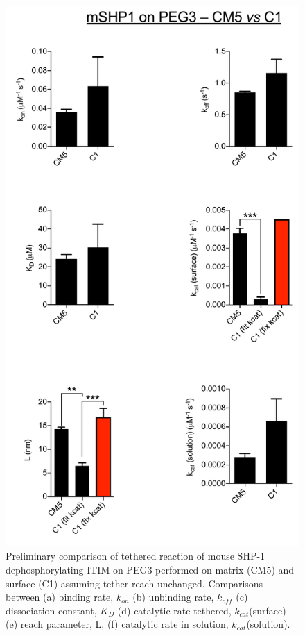 \documentclass[../../AdvancementSummary.tex]{subfiles}
\begin{document}
\begin{figure}[H]
	\begin{center}
		\includegraphics[scale=0.5]{ResultsFigures/ExperimentalDataPlots/mSHP1_on_PEG3_CM5_vs_C1.pdf}
	\end{center}
	\caption{Preliminary comparison of tethered reaction of mouse SHP-1 dephosphorylating ITIM on PEG3 performed on matrix (CM5) and surface (C1) assuming tether reach unchanged. Comparisons between (a) binding rate, $k_{on}$ (b) unbinding rate, $k_{off}$ (c) dissociation constant, $K_D$ (d) catalytic rate tethered, $k_{cat}$(surface) (e) reach parameter, L, (f) catalytic rate in solution, $k_{cat}$(solution).}
\end{figure}
\end{document}
